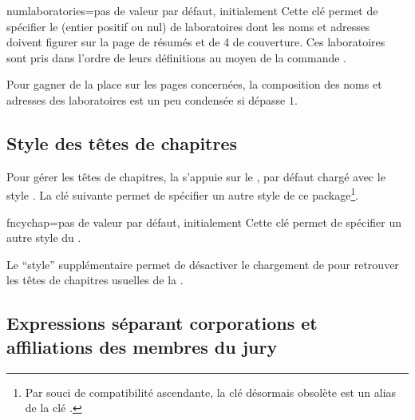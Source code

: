 \begin{docKey}{numlaboratories}{=}{pas de valeur par
    défaut, initialement }
  Cette clé permet de spécifier le  (entier positif ou nul) de
  laboratoires dont les noms et adresses doivent figurer sur la page de résumés
  et de 4\ieme{} de couverture. Ces laboratoires sont pris dans l'ordre de
  leurs définitions au moyen de la commande .
\end{docKey}

Pour gagner de la place sur les pages concernées, la composition des noms et
adresses des laboratoires est un peu condensée si  dépasse $1$.

\subsection{Style des têtes de chapitres}\label{sec-style-des-tetes}

Pour gérer les têtes de chapitres, la \yatCl{} s'appuie sur le
, par défaut chargé avec le style . La
clé  suivante permet de spécifier un autre style de ce
package\footnote{Par souci de compatibilité ascendante, la clé désormais
  obsolète  est un alias de la clé
  .}.%
%
{%
  \begin{docKey}{fncychap}{=\textbar{}\textbar{}\textbar{}\textbar{}\textbar{}\textbar{}\textbar{}\textbar{}}{pas
      de valeur par défaut, initialement }
    Cette clé permet de spécifier un autre style du .

    Le \enquote{style} supplémentaire  permet de désactiver le
    chargement de  pour retrouver les têtes de chapitres
    usuelles de la .
  \end{docKey}
}

\subsection{Expressions séparant corporations et affiliations des membres du jury}
\label{sec-expr-separ-les}%
%

